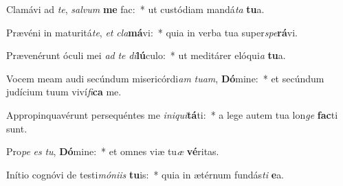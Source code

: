 \item Clamávi ad \textit{te}, \textit{sal}\textit{vum} \textbf{me} fac:~* ut custódiam mandá\textit{ta} \textbf{tu}a.
\item Prævéni in maturitá\textit{te}, \textit{et} \textit{cla}\textbf{má}vi:~* quia in verba tua super\textit{spe}\textbf{rá}vi.
\item Prævenérunt óculi mei \textit{ad} \textit{te} \textit{di}\textbf{lú}culo:~* ut meditárer elóqui\textit{a} \textbf{tu}a.
\item Vocem meam audi secúndum misericórdi\textit{am} \textit{tu}\textit{am}, \textbf{Dó}mine:~* et secúndum judícium tuum viví\textit{fi}\textbf{ca} me.
\item Appropinquavérunt persequéntes me \textit{in}\textit{i}\textit{qui}\textbf{tá}ti:~* a lege autem tua lon\textit{ge} \textbf{fac}ti sunt.
\item Pro\textit{pe} \textit{es} \textit{tu}, \textbf{Dó}mine:~* et omnes viæ tu\textit{æ} \textbf{vé}ritas.
\item Inítio cognóvi de testi\textit{mó}\textit{ni}\textit{is} \textbf{tu}is:~* quia in ætérnum fundás\textit{ti} \textbf{e}a.
